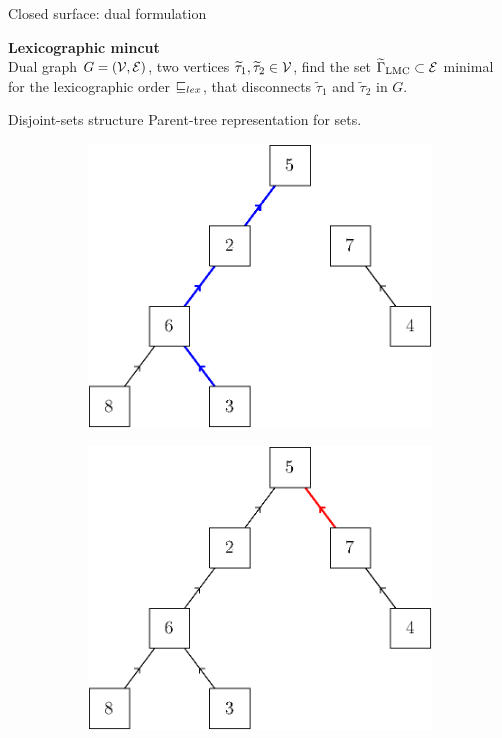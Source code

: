 \begin{frame}{Closed surface: dual formulation}
\pause

\textbf{Lexicographic mincut}\\
Dual graph $G=(\mathcal{V}, \mathcal{E})$, two vertices $\widetilde{\tau}_1,\widetilde{\tau}_2 \in \mathcal{V}$, find the set $\widetilde{\Gamma}_{\operatorname{LMC}} \subset \mathcal{E}$ minimal for the lexicographic order $\sqsubseteq_{lex}$, that  disconnects $\widetilde{\tau}_1$ and $\widetilde{\tau}_2$ in $G$.

\end{frame}

\begin{frame}{Disjoint-sets structure}
	Parent-tree representation for sets.
	\begin{figure}
		\centering%
		\begin{subfigure}{0.45\textwidth}
			\includegraphics[width=\linewidth]{ds/disjoint_find}
		\end{subfigure}%
		\hspace{0.045\textwidth}%
		\vline%
		\hspace{0.045\textwidth}%
		\begin{subfigure}{0.45\textwidth}
			\includegraphics[width=\linewidth]{ds/disjoint_link}

\end{subfigure}
\end{figure}
\end{frame}
